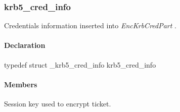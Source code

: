 \documentclass[letterpaper,10pt,english]{sphinxmanual}
\begin{document}

\begin{fulllineitems}
\label{appdev/refs/types/krb5_cred_enc_part:c.krb5_cred_enc_part.ticket_info}
\end{fulllineitems}



\subsubsection{krb5\_cred\_info}
\label{appdev/refs/types/krb5_cred_info:krb5-cred-info-struct}\label{appdev/refs/types/krb5_cred_info::doc}\label{appdev/refs/types/krb5_cred_info:krb5-cred-info}

\begin{fulllineitems}
\label{appdev/refs/types/krb5_cred_info:c.krb5_cred_info}
\end{fulllineitems}


Credentials information inserted into \emph{EncKrbCredPart} .


\paragraph{Declaration}
\label{appdev/refs/types/krb5_cred_info:declaration}
typedef struct \_krb5\_cred\_info  krb5\_cred\_info


\paragraph{Members}
\label{appdev/refs/types/krb5_cred_info:members}

\begin{fulllineitems}
\label{appdev/refs/types/krb5_cred_info:c.krb5_cred_info.magic}
\end{fulllineitems}


\begin{fulllineitems}
\label{appdev/refs/types/krb5_cred_info:c.krb5_cred_info.session}
Session key used to encrypt ticket.

\end{fulllineitems}
\end{document}
